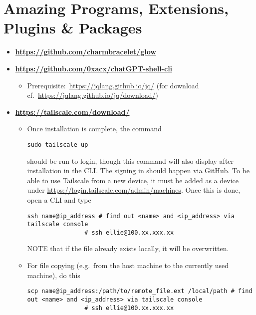\documentclass[12pt, a4paper]{article}
\numberwithin{equation}{section}
\theoremstyle{definition}
\theoremstyle{definition}
\begin{document}
\newpage 

\section{Amazing Programs, Extensions, Plugins \& Packages}

	\begin{itemize}
		\item \textbf{\url{https://github.com/charmbracelet/glow}}
		\item \textbf{\url{https://github.com/0xacx/chatGPT-shell-cli}}
		
		\begin{itemize}
			\item Prerequisite:~\url{https://jqlang.github.io/jq/} (for download cf.~\url{https://jqlang.github.io/jq/download/})
		\end{itemize}
		
		\item \textbf{\url{https://tailscale.com/download/}}
		
		\begin{itemize}
			\item Once installation is complete, the command 
			
			\begin{lstlisting}[style=mystylepython, label=alg:tailscale_login, xleftmargin=\parindent]
				sudo tailscale up
			\end{lstlisting}
		
			should be run to login, though this command will also display after installation in the CLI. The signing in should happen via GitHub. To be able to use Tailscale from a new device, it must be added as a device under \url{https://login.tailscale.com/admin/machines}. Once this is done, open a CLI and type 
			
			\begin{lstlisting}[style=mystylepython, label=alg:tailscale_connec, xleftmargin=\parindent]
				ssh name@ip_address # find out <name> and <ip_address> via tailscale console
				# ssh ellie@100.xx.xxx.xx
			\end{lstlisting}
		
			NOTE that if the file already exists locally, it will be overwritten.
			
			\item For file copying (e.g.~from the host machine to the currently used machine), do this
			
			\begin{lstlisting}[style=mystylepython, label=alg:tailscale__scp_file, xleftmargin=\parindent]
				scp name@ip_address:/path/to/remote_file.ext /local/path # find out <name> and <ip_address> via tailscale console
				# ssh ellie@100.xx.xxx.xx
			\end{lstlisting}
			

\end{itemize}
\end{itemize}
\end{document}
